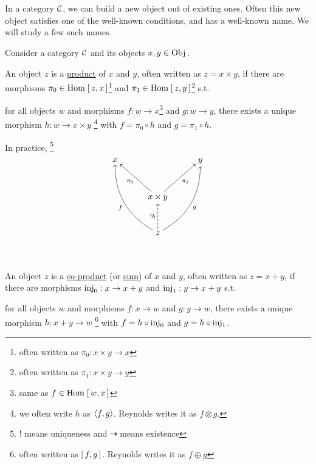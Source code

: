 \begin{enumcirc}
	\item
	In a category $\mathcal{C}$, we can build a new object out of existing ones.
	Often this new object satisfies one of the well-known conditions, and has a
	well-known name.
	We will study a few such names.
	\item
	Consider a category $\mathcal{C}$ and its objects $x, y \in \textrm{Obj}_{\textrm{\tiny \ensuremath{{}_{}}}}$.
	\begin{enumrm}
		\item
		An object $z$ is a \ul{product} of $x$ and $y$, often written as
		$z = x \times y$,
		if there are morphisms
		$\pi_0 \in \textrm{Hom}_{\textrm{\tiny \ensuremath{{}_{}}}}\left[ \, z, x \, \right]$\footnote{often written as $\pi_0 : x \times y \to x$}
		and $\pi_1 \in \textrm{Hom}_{\textrm{\tiny \ensuremath{{}_{}}}}\left[ \, z, y \, \right]$\footnote{often written as $\pi_1 : x \times y \to
				y$}
		s.t.

		for all objects $w$ and morphisms
		$f: w \to x$\footnote{same as $f \in \textrm{Hom}_{\textrm{\tiny \ensuremath{{}_{}}}}\left[ \, w, x \, \right]$}
		and $g: w \to y$, there exists a unique morphism
		$h: w \to x \times y$
		\footnote{we often write $h$ as $\left\langle f, g \right\rangle$. Reynolds writes it as
			$f\otimes g$.}
		with $f = \pi_0 \circ h$ and $g = \pi_1 \circ h$.

		In practice,
		\footnote{! means uniqueness and $\dasharrow$ means existence}
		\[
			\begin{tikzcd}[cramped, sep=3em]
				x&
				&
				y\\
				&
				x \times y \arrow[ul, "\pi_0"] \arrow[ur, swap, "\pi_1"]
				&
				\\
				&
				z \arrow[u, dashed, "!h"] \arrow[uul, "f", bend left = 30] \arrow[uur, swap, "g", bend right = 30]
				&
				\\
			\end{tikzcd}
		\]
		\item
		An object $z$ is a \ul{co-product} (or \ul{sum}) of $x$ and $y$, often written
		as $z = x + y$,
		if there are morphisms $\textrm{inj}_0: x \to x + y$ and $\textrm{inj}_1: y \to x + y$ s.t.

		for all objects $w$ and morphisms $f: x \to w$ and $g: y \to w$, there exists a
		unique morphism $h: x + y \to w$
		\footnote{often written as $\left[ \, f, g \, \right]$. Reynolds writes it as $f \oplus g$}
		with $f = h \circ \textrm{inj}_0$ and $g = h \circ \textrm{inj}_1$.


\end{enumrm}
\end{enumcirc}
